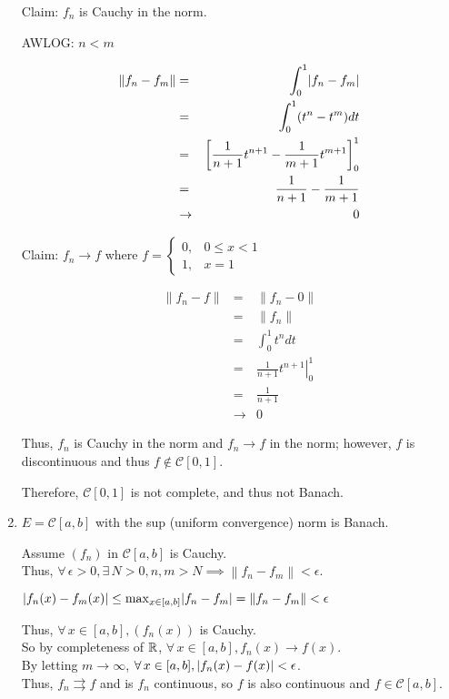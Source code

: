 \documentclass[letterpaper,12pt,fleqn]{article}
\newcommand{\norm}[1]{\left\|#1\right\|}
\newcommand{\mc}{\mathcal{C}}
\newcommand{\e}{\epsilon}
\begin{document}
\begin{examples}
\begin{enumerate}
    Claim: $f_n$ is Cauchy in the norm.

    AWLOG: $n<m$
    
    \begin{eqnarray*}
      \norm{f_n-f_m} &=& \int_0^1\abs{f_n-f_m} \\
      &=& \int_0^1(t^n-t^m)dt \\
      &=& \left[\frac{1}{n+1}t^{n+1}-\frac{1}{m+1}t^{m+1}\right]_0^1 \\
      &=& \frac{1}{n+1}-\frac{1}{m+1} \\
      &\to& 0
    \end{eqnarray*}

    Claim: $f_n\to f$ where
    $f=\begin{cases}0, & 0\le x<1 \\ 1, & x=1\end{cases}$

    \begin{eqnarray*}
      \norm{f_n-f} &=& \norm{f_n-0} \\
      &=& \norm{f_n} \\
      &=& \int_0^1t^ndt \\
      &=& \left.\frac{1}{n+1}t^{n+1}\right|_0^1 \\
      &=& \frac{1}{n+1} \\
      &\to& 0
    \end{eqnarray*}

    Thus, $f_n$ is Cauchy in the norm and $f_n\to f$ in the norm; however, $f$
    is discontinuous and thus $f\notin\mc[0,1]$.

    Therefore, $\mc[0,1]$ is not complete, and thus not Banach.

  \item $E=\mc[a,b]$ with the sup (uniform convergence) norm is Banach.

    Assume $(f_n)$ in $\mc[a,b]$ is Cauchy. \\
    Thus, $\forall\,\e>0,\exists\,N>0,n,m>N\implies\norm{f_n-f_m}<\e$.

    $\abs{f_n(x)-f_m(x)}\le\max_{x\in[a,b]}\abs{f_n-f_m}=\norm{f_n-f_m}<\e$

    Thus, $\forall\,x\in[a,b],(f_n(x))$ is Cauchy. \\
    So by completeness of $\mathbb{R}$, $\forall\,x\in[a,b],f_n(x)\to f(x)$. \\
    By letting $m\to\infty$, $\forall\,x\in[a,b],\abs{f_n(x)-f(x)}<\e$. \\
    Thus, $f_n\rightrightarrows f$ and is $f_n$ continuous, so $f$ is also
    continuous and $f\in\mc[a,b]$.


\end{enumerate}
\end{examples}
\end{document}
